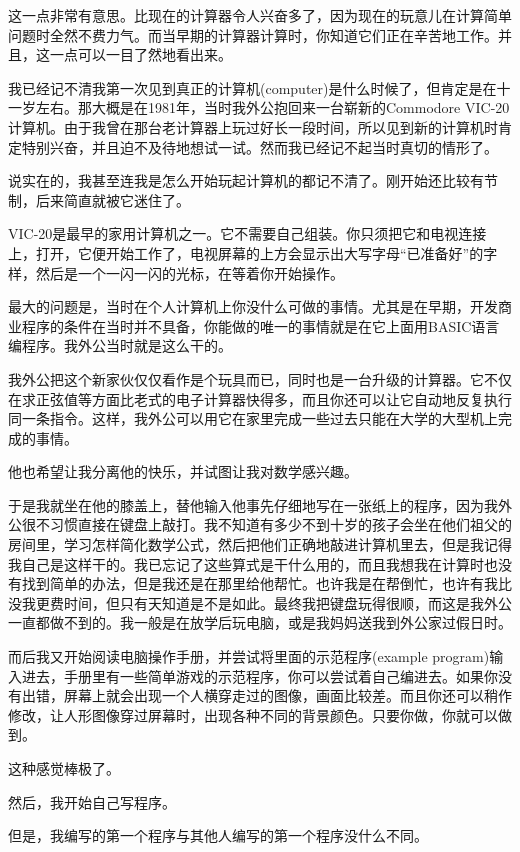这一点非常有意思。比现在的计算器令人兴奋多了，因为现在的玩意儿在计算简单问题时全然不费力气。而当早期的计算器计算时，你知道它们正在辛苦地工作。并且，这一点可以一目了然地看出来。

我已经记不清我第一次见到真正的计算机(computer)是什么时候了，但肯定是在十一岁左右。那大概是在1981年，当时我外公抱回来一台崭新的Commodore VIC-20计算机。由于我曾在那台老计算器上玩过好长一段时间，所以见到新的计算机时肯定特别兴奋，并且迫不及待地想试一试。然而我已经记不起当时真切的情形了。

说实在的，我甚至连我是怎么开始玩起计算机的都记不清了。刚开始还比较有节制，后来简直就被它迷住了。

VIC-20是最早的家用计算机之一。它不需要自己组装。你只须把它和电视连接上，打开，它便开始工作了，电视屏幕的上方会显示出大写字母“已准备好”的字样，然后是一个一闪一闪的光标，在等着你开始操作。

最大的问题是，当时在个人计算机上你没什么可做的事情。尤其是在早期，开发商业程序的条件在当时并不具备，你能做的唯一的事情就是在它上面用BASIC语言编程序。我外公当时就是这么干的。

我外公把这个新家伙仅仅看作是个玩具而已，同时也是一台升级的计算器。它不仅在求正弦值等方面比老式的电子计算器快得多，而且你还可以让它自动地反复执行同一条指令。这样，我外公可以用它在家里完成一些过去只能在大学的大型机上完成的事情。

他也希望让我分离他的快乐，并试图让我对数学感兴趣。

于是我就坐在他的膝盖上，替他输入他事先仔细地写在一张纸上的程序，因为我外公很不习惯直接在键盘上敲打。我不知道有多少不到十岁的孩子会坐在他们祖父的房间里，学习怎样简化数学公式，然后把他们正确地敲进计算机里去，但是我记得我自己是这样干的。我已忘记了这些算式是干什么用的，而且我想我在计算时也没有找到简单的办法，但是我还是在那里给他帮忙。也许我是在帮倒忙，也许有我比没我更费时间，但只有天知道是不是如此。最终我把键盘玩得很顺，而这是我外公一直都做不到的。我一般是在放学后玩电脑，或是我妈妈送我到外公家过假日时。

而后我又开始阅读电脑操作手册，并尝试将里面的示范程序(example program)输入进去，手册里有一些简单游戏的示范程序，你可以尝试着自己编进去。如果你没有出错，屏幕上就会出现一个人横穿走过的图像，画面比较差。而且你还可以稍作修改，让人形图像穿过屏幕时，出现各种不同的背景颜色。只要你做，你就可以做到。

这种感觉棒极了。

然后，我开始自己写程序。

但是，我编写的第一个程序与其他人编写的第一个程序没什么不同。


